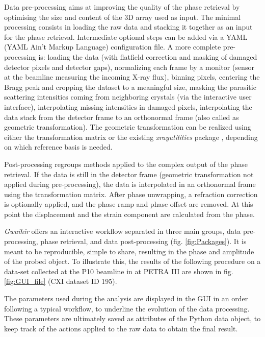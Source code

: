 Data pre-processing aims at improving the quality of the phase retrieval by optimising the size and content of the 3D array used as input.
The minimal processing consists in loading the raw data and stacking it together as an input for the phase retrieval.
Intermediate optional steps can be added via a YAML (YAML Ain't Markup Language) configuration file.
A more complete pre-processing is: loading the data (with flatfield correction and masking of damaged detector pixels and detector gaps), normalizing each frame by a monitor (sensor at the beamline measuring the incoming X-ray flux), binning pixels, centering the Bragg peak and cropping the dataset to a meaningful size, masking the parasitic scattering intensities coming from neighboring crystals (via the interactive user interface), interpolating missing intensities in damaged pixels, interpolating the data stack from the detector frame to an orthonormal frame (also called as geometric transformation).
The geometric transformation can be realized using either the transformation matrix \parencite{thesismark} or the existing  \textit{xrayutilities} package \parencite{kriegner_xrayutilities_2013}, depending on which reference basis is needed.

Post-processing regroups methods applied to the complex output of the phase retrieval. If the data is still in the detector frame (geometric transformation not applied during pre-processing), the data is interpolated in an orthonormal frame using the transformation matrix.
After phase unwrapping, a refraction correction is optionally applied, and the phase ramp and phase offset are removed.
At this point the displacement and the strain component are calculated from the phase.

\textit{Gwaihir} offers an interactive workflow separated in three main groups, data pre-processing, phase retrieval, and data post-processing (fig. \ref{fig:Packages}). It is meant to be reproducible, simple to share, resulting in the phase and amplitude of the probed object. To illustrate this, the results of the following procedure on a data-set collected at the P10 beamline in at PETRA III are shown in fig. \ref{fig:GUI_file} (CXI dataset ID 195).

The parameters used during the analysis are displayed in the GUI in an order following a typical workflow, to underline the evolution of the data processing.
These parameters are ultimately saved as attributes of the Python data object, to keep track of the actions applied to the raw data to obtain the final result.

